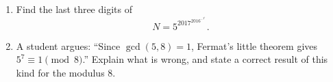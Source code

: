 \begin{enumerate}
\item[(a)] Find the last three digits of
\[N=5^{2017^{2016^{\cdots^{2^1}}}}.\]
\item[(b)] A student argues: ``Since $\gcd(5,8)=1$, Fermat's little theorem gives $5^7\equiv1\pmod8$.'' Explain what is wrong, and state a correct result of this kind for the modulus $8$.
\end{enumerate}
